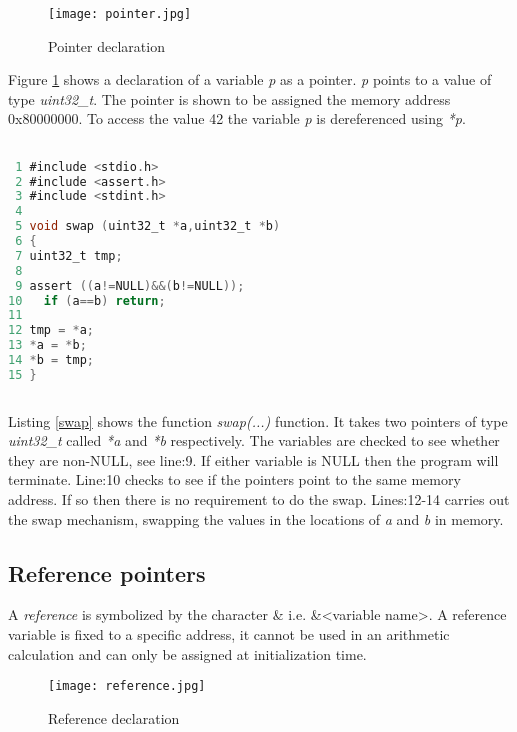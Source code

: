 \begin{figure}[H]
\centerline{\texttt{[image: pointer.jpg]}}
\caption{Pointer declaration}
\label{PointerImg}
\end{figure}

Figure \ref{PointerImg} shows a declaration of a variable \textit{p} as a pointer. \textit{p} points to a value of type \textit{uint32\_t}. The pointer is shown to be assigned the memory address 0x80000000. To access the value 42 the variable \textit{p} is dereferenced using \textit{*p}. 

\begin{lstlisting}[language=C,showstringspaces=false,caption={File: swap.c, part 1 swap function},captionpos=b,label=swap]

 1 #include <stdio.h>
 2 #include <assert.h>
 3 #include <stdint.h>
 4 
 5 void swap (uint32_t *a,uint32_t *b)
 6 {
 7 uint32_t tmp;
 8 
 9 assert ((a!=NULL)&&(b!=NULL));
10   if (a==b) return;
11 
12 tmp = *a;
13 *a = *b;
14 *b = tmp;
15 }
 
\end{lstlisting}

Listing \ref{swap} shows the function \textit{swap(...)} function. It takes two pointers of type \textit{uint32\_t} called \textit{*a} and \textit{*b} respectively. The variables are checked to see whether they are non-NULL, see line:9. If either variable is NULL then the program will terminate. Line:10 checks to see if the pointers point to the same memory address. If so then there is no requirement to do the swap. Lines:12-14 carries out the swap mechanism, swapping the values in the locations of \textit{a} and \textit{b} in memory.

\subsection{Reference pointers}
 
 
A \textit{reference} is symbolized by the character \& i.e.  \&\textless{variable name}\textgreater. A reference variable is fixed to a specific address, it cannot be used in an arithmetic calculation and can only be assigned at initialization time.

\begin{figure}[H]
\centerline{\texttt{[image: reference.jpg]}}
\caption{Reference declaration}
\label{ReferenceImg}
\end{figure}

